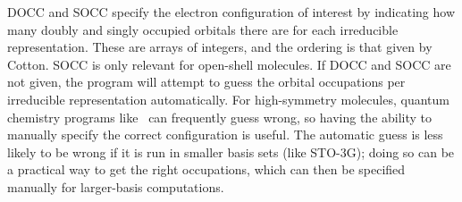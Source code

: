 DOCC and SOCC specify the electron configuration of interest by indicating
how many doubly and singly occupied orbitals there are for each irreducible
representation.  These are arrays of integers, and the ordering is that
given by Cotton.  SOCC is only relevant for open-shell molecules.  If DOCC
and SOCC are not given, the program will attempt to guess the orbital
occupations per irreducible representation automatically. For high-symmetry
molecules, quantum chemistry programs like \PSIfour\ can frequently guess
wrong, so having the ability to manually specify the correct configuration
is useful.  The automatic guess is less likely to be wrong if it is run in
smaller basis sets (like STO-3G); doing so can be a practical way to get
the right occupations, which can then be specified manually for
larger-basis computations.


